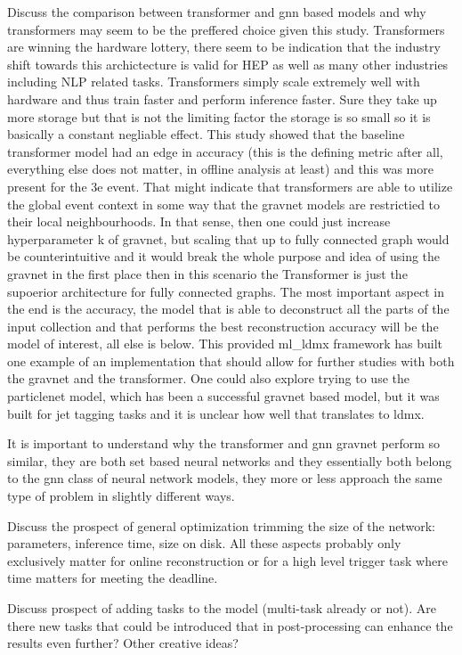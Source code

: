 Discuss the comparison between transformer and gnn based models and why transformers may seem to be the preffered choice given this study. Transformers are winning the hardware lottery, there seem to be indication that the industry shift towards this archictecture is valid for HEP as well as many other industries including NLP related tasks. Transformers simply scale extremely well with hardware and thus train faster and perform inference faster. Sure they take up more storage but that is not the limiting factor the storage is so small so it is basically a constant negliable effect. This study showed that the baseline transformer model had an edge in accuracy (this is the defining metric after all, everything else does not matter, in offline analysis at least) and this was more present for the 3e event. That might indicate that transformers are able to utilize the global event context in some way that the gravnet models are restrictied to their local neighbourhoods. In that sense, then one could just increase hyperparameter k of gravnet, but scaling that up to fully connected graph would be counterintuitive and it would break the whole purpose and idea of using the gravnet in the first place then in this scenario the Transformer is just the supoerior architecture for fully connected graphs. The most important aspect in the end is the accuracy, the model that is able to deconstruct all the parts of the input collection and that performs the best reconstruction accuracy will be the model of interest, all else is below. This provided ml\_ldmx framework has built one example of an implementation that should allow for further studies with both the gravnet and the transformer. One could also explore trying to use the particlenet model, which has been a successful gravnet based model, but it was built for jet tagging tasks and it is unclear how well that translates to ldmx. 

It is important to understand why the transformer and gnn gravnet perform so similar, they are both set based neural networks and they essentially both belong to the gnn class of neural network models, they more or less approach the same type of problem in slightly different ways. 

Discuss the prospect of general optimization trimming the size of the network: parameters, inference time, size on disk. All these aspects probably only exclusively matter for online reconstruction or for a high level trigger task where time matters for meeting the deadline. 

Discuss prospect of adding tasks to the model (multi-task already or not). Are there new tasks that could be introduced that in post-processing can enhance the results even further? Other creative ideas? 


